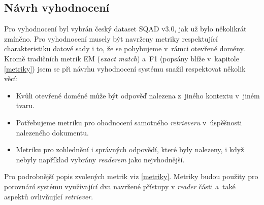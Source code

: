 \subsection{Návrh vyhodnocení}
Pro vyhodnocení byl vybrán český dataset SQAD v3.0, jak už bylo několikrát zmíněno. Pro vyhodnocení musely být navrženy metriky respektující charakteristiku datové sady i to, že se pohybujeme v~rámci otevřené domény. Kromě tradičních metrik EM (\emph{exact match}) a~F1 (popsány blíže v~kapitole \ref{metriky}) jsem se při návrhu vyhodnocení systému snažil respektovat několik věcí:
\begin{itemize}
    \item Kvůli otevřené doméně může být odpověď nalezena z~jiného kontextu v~jiném tvaru.
    \item Potřebujeme metriku pro ohodnocení samotného \emph{retrieveru} v~úspěšnosti nalezeného dokumentu.
    \item Metriku pro zohlednění i správných odpovědí, které byly nalezeny, i když nebyly například vybrány \emph{readerem} jako nejvhodnější.
\end{itemize}
Pro podrobnější popis zvolených metrik viz \ref{metriky}. Metriky budou použity pro porovnání systému využívající dva navržené přístupy v \emph{reader} části a~také aspektů ovlivňující \emph{retriever}.

